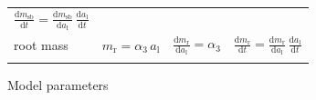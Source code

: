 \documentclass[10pt,twoside]{article}
\begin{document}
\begin{table}[ht]
\begin{tabular}{p{2.5cm}p{3.5cm}p{5cm}p{4cm} }
    $\frac{\textrm{d}m_\textrm{sb}}{\textrm{d}t}  = \frac{\textrm{d}m_\textrm{sb}}{\textrm{d}a_\textrm{l}} \, \frac{\textrm{d}a_\textrm{l}}{\textrm{d}t}$ \\
  root mass &
    $m_\textrm{r} = \alpha_3 \, a_\textrm{l}$ &
    $\frac{\textrm{d}m_\textrm{r}}{\textrm{d}a_\textrm{l}} = \alpha_3$  &
    $\frac{\textrm{d}m_\textrm{r}}{\textrm{d}t}  = \frac{\textrm{d}m_\textrm{r}}{\textrm{d}a_\textrm{l}}  \, \frac{\textrm{d}a_\textrm{l}}{\textrm{d}t}$ \\ 
  \hline \\
\end{tabular}
\label{tab:allometry}
\end{table}

\newpage

\begin{table}[h!]
\caption{Model parameters}

\label{tab:params}
\end{table}

\clearpage


\end{document}
